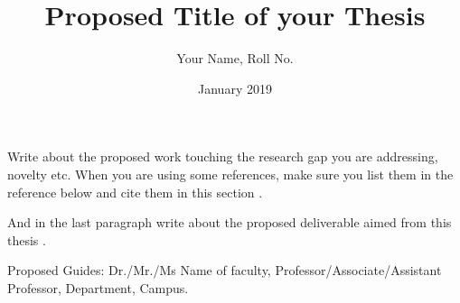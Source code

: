 \documentclass[12pt]{extarticle}
\title{Proposed Title of your Thesis}
\author{Your Name, Roll No.}
\date{January 2019}
\begin{document}
\maketitle

Write about the proposed work touching the research gap you are addressing, novelty etc. When you are using some references, make sure you list them in the reference below and cite them in this section \cite{Linhart2014} \cite{Linhart2008}.

And in the last paragraph write about the proposed deliverable aimed from this thesis  \cite{fractalwiki}.

Proposed Guides: Dr./Mr./Ms Name of faculty, Professor/Associate/Assistant Professor, Department, Campus.  \nocite{higham1998handbook}




\end{document}
